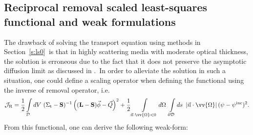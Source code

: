 \documentclass[review]{elsarticle}
\newcommand{\st}{\sigma_\mathrm{t}}
\newcommand{\psii}[1]{\psi^\mathrm{inc}_\mathrm{{#1}}}
\newcommand{\omen}{\ome\cdot\nabla}
\newcommand{\pd}{{\partial\mathcal{D}}}
\newcommand{\intli}[1]{\int\limits_{{#1}}}
\newcommand{\ndo}{\vec{n}\cdot\ome}
\newcommand{\absndo}{\left|\ndo\right|}
\newcommand{\intd}{\int\limits_\mathcal{D}dV\ }
\newcommand{\intfpd}{\int\limits_{4\pi}d\Omega\ \int\limits_\mathcal{D}dV\ }
\newcommand{\ome}{\vv{\Omega}}
\newcommand{\dome}{d\Omega}
\newcommand{\lp}{\left(}
\newcommand{\rp}{\right)}
\newcommand{\bs}{\mathbf{S}}
\newcommand{\bl}{\mathbf{L}}
\newcommand{\bst}{\Sigma_\mathrm{t}}
\newcommand{\half}{\frac{1}{2}}
\newcommand{\vphi}{\vec{\phi}}
\begin{document}
\subsection{Reciprocal removal scaled least-squares functional and weak formulations}
The drawback of solving the transport equation using methods in Section\ \ref{s:ls0}\ is that in highly scattering media with moderate optical thickness, the solution is erroneous {due to the fact that it does not preserve the asymptotic diffusion limit as discussed in \cite{manteuffel_lspn_scaling,varin_lspn}}.\ In order to alleviate the solution in such a situation, one could define a scaling operator when defining the functional using the inverse of removal operator, i.e.
\begin{equation}
\mathcal{J}_\mathrm{R}=\half\intd(\bst-\bs)^{-1}\lp(\bl-\bs)\vphi-{\vec{Q}}\rp^2+\half\intli{\ndo<0}\dome\ \intli{\pd}ds\ \absndo(\psi-\psii{})^2.
\end{equation}
From this functional, one can derive the following weak-form:
\end{document}
